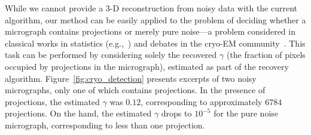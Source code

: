 \documentclass[9pt,twocolumn,twoside,lineno]{pnas-new}
\begin{document}
While we cannot provide a 3-D reconstruction from noisy data with the current algorithm, our method can be easily applied to the problem of deciding whether a micrograph contains projections or merely pure noise---a problem considered in classical works in statistics (e.g.,~\cite{donoho2004higher}) and debates in the cryo-EM community~\cite{henderson2013avoiding}.
This task can be performed by considering solely the recovered $\gamma$ (the fraction of pixels occupied by projections in the micrograph), estimated as part of the recovery algorithm.
Figure~\ref{fig:cryo_detection} presents excerpts  of two noisy micrographs, only one of which contains projections.
In the presence of projections, the estimated $\gamma$ was $0.12$, corresponding to approximately $6784$ projections. 
On the hand, the estimated $\gamma$ drops to $10^{-5}$ for the pure noise micrograph, corresponding to less than one projection.
%
\end{document}
